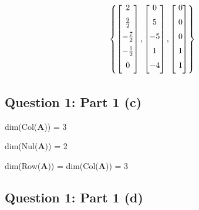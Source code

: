\documentclass{article}
\begin{document}
\[%
    \left\{
    \begin{bmatrix} \vspace{2mm}
        2 \\ \vspace{2mm}
        \frac{9}{2}  \\ \vspace{2mm}
        -\frac{7}{2}  \\ \vspace{2mm}
        -\frac{1}{2}  \\ \vspace{2mm}
        0 \\ 
    \end{bmatrix},
    \begin{bmatrix} \vspace{2mm}
        0  \\ \vspace{2mm}
        5  \\ \vspace{2mm}
        -5 \\ \vspace{2mm}
        1  \\ \vspace{2mm}
        -4 \\ 
    \end{bmatrix},
    \begin{bmatrix} \vspace{2mm}
        \ 0 \\ \vspace{2mm} 
        \ 0 \\ \vspace{2mm} 
        \ 0 \\ \vspace{2mm} 
        \ 1 \\ \vspace{2mm} 
        \ 1 \\		
    \end{bmatrix}
    \right\}
\]%



\subsection{Question 1: Part 1 (c)} 
dim(Col($\mathbf{A}$)) = 3

dim(Nul($ \mathbf{A} $)) = 2

dim(Row($ \mathbf{A} $)) = dim(Col($\mathbf{A}$)) = 3

\clearpage
\subsection{Question 1: Part 1 (d)} 
\end{document}
